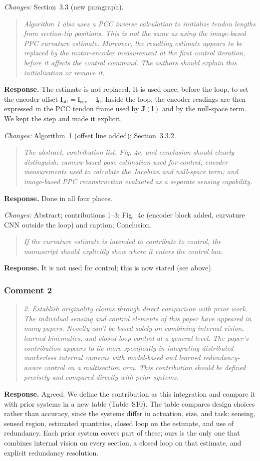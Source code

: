 \documentclass[11pt,a4paper]{article}
\newcommand{\rc}[1]{\begin{quote}\color{black!70}\itshape #1\end{quote}}
\begin{document}
\textit{Changes:} Section~3.3 (new paragraph).

\rc{Algorithm 1 also uses a PCC inverse calculation to initialize tendon lengths from section-tip positions. This is not the same as using the image-based PPC curvature estimate. Moreover, the resulting estimate appears to be replaced by the motor-encoder measurement at the first control iteration, before it affects the control command. The authors should explain this initialization or remove it.}
\textbf{Response.} The estimate is not replaced. It is used once, before the loop, to set the encoder offset $\mathbf{l}_{\mathrm{off}} = \mathbf{l}_{\mathrm{enc}} - \mathbf{l}_0$. Inside the loop, the encoder readings are then expressed in the PCC tendon frame used by $\mathbf{J}(\mathbf{l})$ and by the null-space term. We kept the step and made it explicit.

\textit{Changes:} Algorithm~1 (offset line added); Section~3.3.2.

\rc{The abstract, contribution list, Fig. 4c, and conclusion should clearly distinguish: camera-based pose estimation used for control; encoder measurements used to calculate the Jacobian and null-space term; and image-based PPC reconstruction evaluated as a separate sensing capability.}
\textbf{Response.} Done in all four places.

\textit{Changes:} Abstract; contributions 1--3; Fig.~4c (encoder block added, curvature CNN outside the loop) and caption; Conclusion.

\rc{If the curvature estimate is intended to contribute to control, the manuscript should explicitly show where it enters the control law.}
\textbf{Response.} It is not used for control; this is now stated (see above).

\subsubsection*{Comment 2}

\rc{2. Establish originality claims through direct comparison with prior work. The individual sensing and control elements of this paper have appeared in many papers. Novelty can't be based solely on combining internal vision, learned kinematics, and closed-loop control at a general level. The paper's contribution appears to lie more specifically in integrating distributed markerless internal cameras with model-based and learned redundancy-aware control on a multisection arm. This contribution should be defined precisely and compared directly with prior systems.}
\textbf{Response.} Agreed. We define the contribution as this integration and compare it with prior systems in a new table (Table~S10). The table compares design choices rather than accuracy, since the systems differ in actuation, size, and task: sensing, sensed region, estimated quantities, closed loop on the estimate, and use of redundancy. Each prior system covers part of these; ours is the only one that combines internal vision on every section, a closed loop on that estimate, and explicit redundancy resolution.
\end{document}
